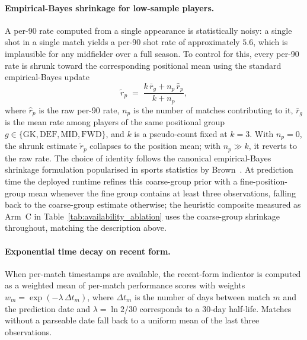 \paragraph{Empirical-Bayes shrinkage for low-sample players.}
A per-90 rate computed from a single appearance is statistically noisy: a single shot in a single match yields a per-90 shot rate of approximately $5.6$, which is implausible for any midfielder over a full season. To control for this, every per-90 rate is shrunk toward the corresponding positional mean using the standard empirical-Bayes update
\begin{equation}
    \tilde{r}_p \;=\; \frac{k \, \bar{r}_g + n_p \, \hat{r}_p}{k + n_p},
    \label{eq:eb_shrinkage}
\end{equation}
where $\hat{r}_p$ is the raw per-90 rate, $n_p$ is the number of matches contributing to it, $\bar{r}_g$ is the mean rate among players of the same positional group $g \in \{\text{GK}, \text{DEF}, \text{MID}, \text{FWD}\}$, and $k$ is a pseudo-count fixed at $k = 3$. With $n_p = 0$, the shrunk estimate $\tilde{r}_p$ collapses to the position mean; with $n_p \gg k$, it reverts to the raw rate. The choice of identity follows the canonical empirical-Bayes shrinkage formulation popularised in sports statistics by Brown~\cite{brown2008empirical}. At prediction time the deployed runtime refines this coarse-group prior with a fine-position-group mean whenever the fine group contains at least three observations, falling back to the coarse-group estimate otherwise; the heuristic composite measured as Arm~C in Table~\ref{tab:availability_ablation} uses the coarse-group shrinkage throughout, matching the description above.

\paragraph{Exponential time decay on recent form.}
When per-match timestamps are available, the recent-form indicator is computed as a weighted mean of per-match performance scores with weights $w_m = \exp(-\lambda \, \Delta t_m)$, where $\Delta t_m$ is the number of days between match $m$ and the prediction date and $\lambda = \ln 2 / 30$ corresponds to a $30$-day half-life. Matches without a parseable date fall back to a uniform mean of the last three observations.


